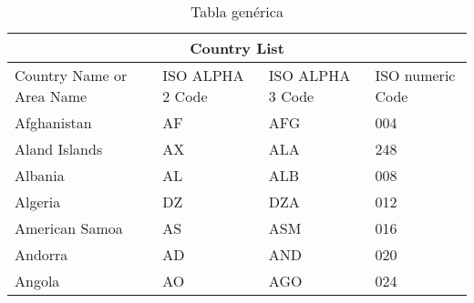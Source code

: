 \documentclass{report}
\begin{document}
	\begin{table}[htb]
		\begin{center}
			\begin{tabular}{|p{3cm}||p{3cm}|p{3cm}|p{3cm}| }
				\hline
				\multicolumn{4}{|c|}{Country List} \\
				\hline
				Country Name     or Area Name& ISO ALPHA 2 Code &ISO ALPHA 3 Code&ISO numeric Code\\
				\hline
				Afghanistan   & AF    &AFG&   004\\
				Aland Islands&   AX  & ALA   &248\\
				Albania &AL & ALB&  008\\
				Algeria    &DZ & DZA&  012\\
				American Samoa&   AS  & ASM&016\\
				Andorra& AD  & AND   &020\\
				Angola& AO  & AGO&024\\
				\hline	
			\end{tabular}
			\caption{Tabla genérica}
			\label{tabla:gen}
		\end{center}
	\end{table}
		

	
	
	
	
\end{document}
